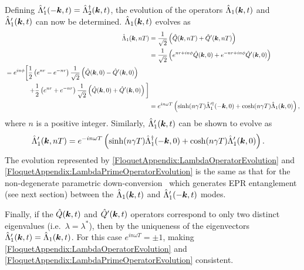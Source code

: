 Defining $\hat{\Lambda}_1'(-\bm{k}, t) = \hat{\Lambda}_2^\dagger(\bm{k}, t)$, the evolution of the operators $\hat{\Lambda}_1(\bm{k}, t)$ and $\hat{\Lambda}_1'(\bm{k}, t)$ can now be determined. $\hat{\Lambda}_1(\bm{k}, t)$ evolves as
\begin{align}
    \hat{\Lambda}_1(\vect{k}, nT) &= \frac{1}{\sqrt{2}} \left(\hat{Q}(\vect{k}, nT) + \hat{Q}'(\vect{k}, nT) \right) \\
        &= \frac{1}{\sqrt{2}} \left( e^{nr + i n\phi} \hat{Q}(\vect{k}, 0) + e^{-nr + i n \phi}\hat{Q}'(\vect{k}, 0)\right) \\
        \begin{split}
            &=  e^{i n \phi} \bigg[ \frac{1}{2}\left( e^{nr} - e^{-nr}\right)\frac{1}{\sqrt{2}}\left(\hat{Q}(\vect{k}, 0) - \hat{Q}'(\vect{k}, 0) \right) \\
            &\relphantom{=e^{i n \phi}\bigg[} + \frac{1}{2} \left( e^{nr} + e^{-nr}\right)\frac{1}{\sqrt{2}} \left( \hat{Q}(\vect{k}, 0) + \hat{Q}'(\vect{k}, 0)\right)\bigg]
        \end{split}\\
        &= e^{i n \omega T} \left( \sinh(n\gamma T) \hat{\Lambda}_1'^\dagger(-\vect{k}, 0) + \cosh(n \gamma T) \hat{\Lambda}_1(\vect{k}, 0)\right), \label{FloquetAppendix:LambdaOperatorEvolution}
\end{align}
where $n$ is a positive integer. Similarly, $\hat{\Lambda}_1'(\bm{k}, t)$ can be shown to evolve as
\begin{align}
    \hat{\Lambda}_1'(\vect{k}, nT) &= e^{-i n \omega T} \left( \sinh(n \gamma T) \hat{\Lambda}_1^\dagger(-\vect{k}, 0) + \cosh(n \gamma T) \hat{\Lambda}_1'(\vect{k}, 0)\right). \label{FloquetAppendix:LambdaPrimeOperatorEvolution}
\end{align}
The evolution represented by \eqref{FloquetAppendix:LambdaOperatorEvolution} and \eqref{FloquetAppendix:LambdaPrimeOperatorEvolution} is the same as that for the non-degenerate parametric down-conversion~\citep{WallsMilburn} which generates EPR entanglement (see next section) between the $\hat{\Lambda}_1(\bm{k}, t)$ and $\hat{\Lambda}_1'(-\bm{k}, t)$ modes.

Finally, if the $\hat{Q}(\bm{k}, t)$ and $\hat{Q}'(\bm{k}, t)$ operators correspond to only two distinct eigenvalues (i.e.\  $\lambda = \lambda^*$), then by the uniqueness of the eigenvectors $\hat{\Lambda}_1'(\bm{k}, t) = \hat{\Lambda}_1(\bm{k}, t)$. For this case $\displaystyle e^{i n\omega T} = \pm 1$, making \eqref{FloquetAppendix:LambdaOperatorEvolution} and \eqref{FloquetAppendix:LambdaPrimeOperatorEvolution} consistent.

